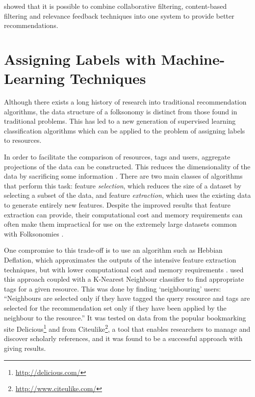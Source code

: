 \documentclass[11pt,a4paper]{report}
\begin{document}
\textcite{Utiyama:2006} showed that it is possible to combine collaborative filtering, content-based filtering and relevance feedback techniques into one system to provide better recommendations.

\section{Assigning Labels with Machine-Learning Techniques}
Although there exists a long history of research into traditional recommendation algorithms, the data structure of a folksonomy is distinct from those found in traditional problems. This has led to a new generation of supervised learning classification algorithms which can be applied to the problem of assigning labels to resources.

In order to facilitate the comparison of resources, tags and users, aggregate projections of the data can be constructed. This reduces the dimensionality of the data by sacrificing some information \parencite{Schmitz:2006}. There are two main classes of algorithms that perform this task: feature \emph{selection}, which reduces the size of a dataset by selecting a subset of the data, and feature \emph{extraction}, which uses the existing data to generate entirely new features. Despite the improved results that feature extraction can provide, their computational cost and memory requirements can often make them impractical for use on the extremely large datasets common with Folksonomies \parencite{Gemmell:2009}.

One compromise to this trade-off is to use an algorithm such as Hebbian Deflation, which approximates the outputs of the intensive feature extraction techniques, but with lower computational cost and memory requirements \parencite{Oja:1985}. \textcite{Gemmell:2009} used this approach coupled with a K-Nearest Neighbour classifier to find appropriate tags for a given resource. This was done by finding `neighbouring' users: ``Neighbours are selected only if they have tagged the query resource and tags are selected for the recommendation set only if they have been applied by the neighbour to the resource.'' It was tested on data from the popular bookmarking site Delicious\footnote{\url{http://delicious.com/}} and from Citeulike\footnote{\url{http://www.citeulike.com/}}, a tool that enables researchers to manage and discover scholarly references, and it was found to be a successful approach with giving results.
\end{document}
